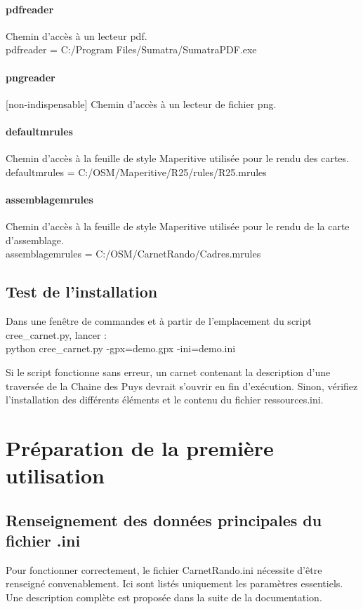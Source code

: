 \documentclass[12pt,french]{article}
\begin{document}
\paragraph{pdfreader} Chemin d'accès à un lecteur pdf.\\
pdfreader = C:/Program Files/Sumatra/SumatraPDF.exe
\paragraph{pngreader} [non-indispensable] Chemin d'accès à un lecteur de fichier png.
\paragraph{defaultmrules} Chemin d'accès à la feuille de style Maperitive utilisée pour le rendu des cartes.\\
defaultmrules = C:/OSM/Maperitive/R25/rules/R25.mrules
\paragraph{assemblagemrules} Chemin d'accès à la feuille de style Maperitive utilisée pour le rendu de la carte d'assemblage.\\
assemblagemrules = C:/OSM/CarnetRando/Cadres.mrules

\subsection{Test de l'installation}
Dans une fenêtre de commandes et à partir de l'emplacement du script cree\_carnet.py, lancer : \\
python cree\_carnet.py -gpx=demo.gpx -ini=demo.ini \par 
Si le script fonctionne sans erreur, un carnet contenant la description d'une traversée de la Chaine des Puys devrait s'ouvrir en fin d'exécution. Sinon, vérifiez l'installation des différents éléments et le contenu du fichier ressources.ini.

\section{Préparation de la première utilisation}
\subsection{Renseignement des données principales du fichier .ini}
\label{ini}
Pour fonctionner correctement, le fichier CarnetRando.ini nécessite d'être renseigné convenablement. Ici sont listés uniquement les paramètres essentiels. Une description complète est proposée dans la suite de la documentation.
\end{document}
